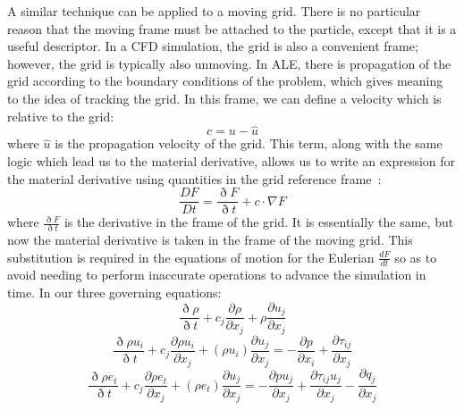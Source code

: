 \documentclass{article}
\def\deriv#1#2{\frac{d #1}{d #2}}
\def\pp#1#2{\frac{\partial #1}{\partial #2}}
\begin{document}
A similar technique can be applied to a moving grid.  There is no particular reason that the moving frame must be attached to the particle, except that it is a useful descriptor.  In a CFD simulation, the grid is also a convenient frame; however, the grid is typically also unmoving.  In ALE, there is propagation of the grid according to the boundary conditions of the problem, which gives meaning to the idea of tracking the grid.  In this frame, we can define a velocity which is relative to the grid:
\begin{equation}
  c = u - \hat{u}
\end{equation}
where $\hat{u}$ is the propagation velocity of the grid.  This term, along with the same logic which lead us to the material derivative, allows us to write an expression for the material derivative using quantities in the grid reference frame~\cite{sarrate01}:
\begin{equation}
  \frac{DF}{Dt} = \frac{\eth F}{\eth t} + c \cdot \nabla F
\end{equation}
where $\frac{\eth F}{\eth t}$ is the derivative in the frame of the grid.  It is essentially the same, but now the material derivative is taken in the frame of the moving grid.  This substitution is required in the equations of motion for the Eulerian $\deriv{F}{t}$ so as to avoid needing to perform inaccurate operations to advance the simulation in time.  In our three governing equations:
\begin{equation}
  \frac{\eth \rho}{\eth t} + c_j \pp{\rho}{x_j} + \rho \pp{u_j}{x_j}
\end{equation}
\begin{equation}
  \frac{\eth \rho u_i}{\eth t} + c_j \pp{\rho u_i}{x_j} + (\rho u_i)\pp{u_j}{x_j} = - \pp{p}{x_i} + \pp{\tau_{ij}}{x_j}
\end{equation}
\begin{equation}
  \frac{\eth \rho e_t}{\eth t} + c_j \pp{\rho e_t}{x_j} + (\rho e_t)\pp{u_j}{x_j} = - \pp{p u_j}{x_j} + \pp{\tau_{ij} u_j}{x_j}  - \pp{q_j}{x_j}
\end{equation}
\end{document}
